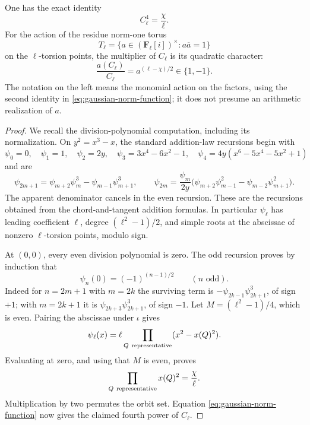 \begin{proposition}\label{prop:gaussian-division-norm}
One has the exact identity
\[
                         C_\ell^4=\frac{\chi}{\ell}.
\]
For the action of the residue norm-one torus
\[
 T_\ell=
 \{a\in(\mathbf F_\ell[i])^\times:a\overline a=1\}
\]
on the \(\ell\)-torsion points, the multiplier of \(C_\ell\)
is its quadratic character:
\[
        \frac{a(C_\ell)}{C_\ell}
                    =a^{(\ell-\chi)/2}\in\{1,-1\}.
\]
The notation on the left means the monomial action on the factors,
using the second identity in
\eqref{eq:gaussian-norm-function}; it does not presume an
arithmetic realization of \(a\).
\end{proposition}
\begin{proof}
We recall the division-polynomial computation, including its
normalization. On \(y^2=x^3-x\), the standard addition-law
recursions begin with
\[
 \psi_0=0,\quad \psi_1=1,\quad \psi_2=2y,\quad
 \psi_3=3x^4-6x^2-1,\quad
 \psi_4=4y(x^6-5x^4-5x^2+1)
\]
and are
\[
 \psi_{2m+1}=\psi_{m+2}\psi_m^3-\psi_{m-1}\psi_{m+1}^3,
 \qquad
 \psi_{2m}=\frac{\psi_m}{2y}
       \bigl(\psi_{m+2}\psi_{m-1}^2
                       -\psi_{m-2}\psi_{m+1}^2\bigr).
\]
The apparent denominator cancels in the even recursion.
These are the recursions obtained from the chord-and-tangent
addition formulas. In particular \(\psi_\ell\) has leading
coefficient \(\ell\), degree \((\ell^2-1)/2\), and simple roots
at the abscissae of nonzero \(\ell\)-torsion points, modulo sign.

At \((0,0)\), every even division polynomial is zero.
The odd recursion proves by induction that
\[
                \psi_n(0)=(-1)^{(n-1)/2}\qquad(n\text{ odd}).
\]
Indeed for \(n=2m+1\) with \(m=2k\) the surviving term is
\(-\psi_{2k-1}\psi_{2k+1}^3\), of sign \(+1\);
with \(m=2k+1\) it is
\(\psi_{2k+3}\psi_{2k+1}^3\), of sign \(-1\).
Let \(M=(\ell^2-1)/4\), which is even.
Pairing the abscissae under \(\iota\) gives
\[
       \psi_\ell(x)=
          \ell\prod_{Q\ {\rm representative}}
                       (x^2-x(Q)^2).
\]
Evaluating at zero, and using that \(M\) is even, proves
\[
            \prod_{Q\ {\rm representative}}x(Q)^2
                         =\frac{\chi}{\ell}.
\]
Multiplication by two permutes the orbit set. Equation
\eqref{eq:gaussian-norm-function} now gives the claimed fourth
power of \(C_\ell\).


\end{proof}
